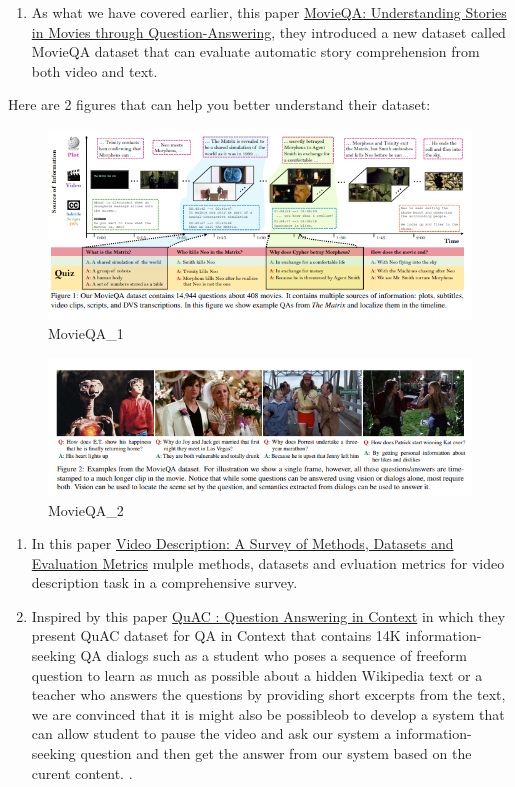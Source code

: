 \documentclass[]{book}
\providecommand{\tightlist}{%
  \setlength{\itemsep}{0pt}\setlength{\parskip}{0pt}}
\theoremstyle{definition}
\theoremstyle{definition}
\theoremstyle{definition}
\theoremstyle{remark}
\begin{document}
\begin{enumerate}
\def\labelenumi{\arabic{enumi}.}
\setcounter{enumi}{3}
\tightlist
\item
  As what we have covered earlier, this paper
  \href{https://arxiv.org/pdf/1512.02902.pdf}{MovieQA: Understanding
  Stories in Movies through Question-Answering}, they introduced a new
  dataset called MovieQA dataset that can evaluate automatic story
  comprehension from both video and text.
\end{enumerate}

Here are 2 figures that can help you better understand their dataset:

\begin{figure}
\centering
\includegraphics{img/movieqa1.png}
\caption{MovieQA\_1}
\end{figure}

\begin{figure}
\centering
\includegraphics{img/movieqa2.png}
\caption{MovieQA\_2}
\end{figure}

\begin{enumerate}
\def\labelenumi{\arabic{enumi}.}
\setcounter{enumi}{4}
\item
  In this paper \href{https://arxiv.org/pdf/1806.00186.pdf}{Video
  Description: A Survey of Methods, Datasets and Evaluation Metrics}
  mulple methods, datasets and evluation metrics for video description
  task in a comprehensive survey.
\item
  Inspired by this paper
  \href{https://arxiv.org/pdf/1808.07036.pdf}{QuAC : Question Answering
  in Context} in which they present QuAC dataset for QA in Context that
  contains 14K information-seeking QA dialogs such as a student who
  poses a sequence of freeform question to learn as much as possible
  about a hidden Wikipedia text or a teacher who answers the questions
  by providing short excerpts from the text, we are convinced that it is
  might also be possibleob to develop a system that can allow student to
  pause the video and ask our system a information-seeking question and
  then get the answer from our system based on the curent content. .
\end{enumerate}
\end{document}
